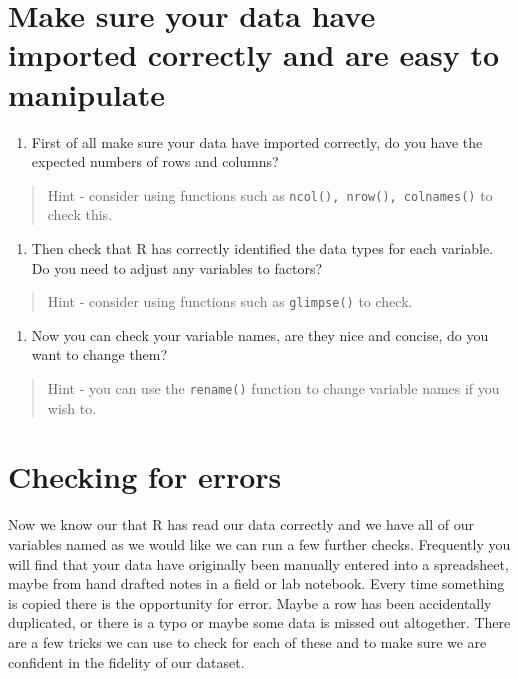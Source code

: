 \documentclass[
]{book}
\providecommand{\tightlist}{%
  \setlength{\itemsep}{0pt}\setlength{\parskip}{0pt}}
\begin{document}
\hypertarget{make-sure-your-data-have-imported-correctly-and-are-easy-to-manipulate}{%
\section{Make sure your data have imported correctly and are easy to manipulate}\label{make-sure-your-data-have-imported-correctly-and-are-easy-to-manipulate}}

\begin{enumerate}
\def\labelenumi{\arabic{enumi})}
\tightlist
\item
  First of all make sure your data have imported correctly, do you have the expected numbers of rows and columns?
\end{enumerate}

\begin{quote}
Hint - consider using functions such as \texttt{ncol(),\ nrow(),\ colnames()} to check this.
\end{quote}

\begin{enumerate}
\def\labelenumi{\arabic{enumi})}
\setcounter{enumi}{1}
\tightlist
\item
  Then check that R has correctly identified the data types for each variable. Do you need to adjust any variables to factors?
\end{enumerate}

\begin{quote}
Hint - consider using functions such as \texttt{glimpse()} to check.
\end{quote}

\begin{enumerate}
\def\labelenumi{\arabic{enumi})}
\setcounter{enumi}{2}
\tightlist
\item
  Now you can check your variable names, are they nice and concise, do you want to change them?
\end{enumerate}

\begin{quote}
Hint - you can use the \texttt{rename()} function to change variable names if you wish to.
\end{quote}

\hypertarget{checking-for-errors}{%
\section{Checking for errors}\label{checking-for-errors}}

Now we know our that R has read our data correctly and we have all of our variables named as we would like we can run a few further checks. Frequently you will find that your data have originally been manually entered into a spreadsheet, maybe from hand drafted notes in a field or lab notebook. Every time something is copied there is the opportunity for error. Maybe a row has been accidentally duplicated, or there is a typo or maybe some data is missed out altogether. There are a few tricks we can use to check for each of these and to make sure we are confident in the fidelity of our dataset.
\end{document}
